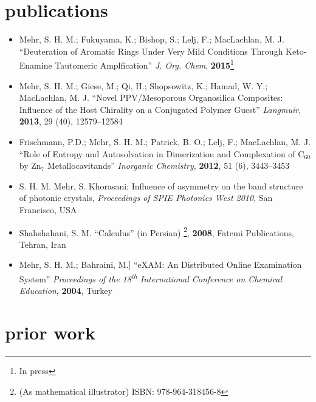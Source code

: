 \documentclass[overlapped,line,10pt,letterpaper]{res}
\begin{document}
\begin{resume}
\section{publications}
\begin{itemize}
\renewcommand{\labelitemi}{$\bullet$}
\item Mehr, S. H. M.; Fukuyama, K.; Bishop, S.; Lelj, F.; MacLachlan, M. J. ``Deuteration of Aromatic Rings Under Very Mild Conditions Through Keto-Enamine  Tautomeric Amplfication'' \emph{J. Org. Chem}, \textbf{2015}\footnote{In press}
\item  Mehr, S. H. M.; Giese, M.; Qi, H.; Shopsowitz, K.; Hamad, W. Y.; MacLachlan, M. J. ``Novel PPV/Mesoporous Organosilica Composites: Influence of the Host Chirality on a Conjugated Polymer Guest'' \emph{Langmuir}, \textbf{2013}, 29 (40), 12579–12584
\item Frischmann, P.D.; Mehr, S. H. M.; Patrick, B. O.; Lelj, F.; MacLachlan, M. J. ``Role of Entropy and Autosolvation in Dimerization and Complexation of $\mathrm{C_{60}}$ by $\mathrm{Zn_7}$ Metallocavitands'' \emph{Inorganic Chemistry}, \textbf{2012}, 51 (6), 3443–3453
\item S. H. M. Mehr, S. Khorasani; Influence of asymmetry on the band structure of photonic crystals, \emph{Proceedings of SPIE Photonics West 2010}, San Francisco, USA
\item Shahshahani, S. M. ``Calculus'' (in Persian) \footnote{ (As mathematical illustrator) ISBN: 978-964-318456-8}, \textbf{2008}, Fatemi Publications, Tehran, Iran
\item Mehr, S. H. M.; Bahraini, M.] ``eXAM: An Distributed Online Examination System'' \emph{Proceedings of the 18\textsuperscript{th} International Conference on Chemical Education}, \textbf{2004}, Turkey
\end{itemize}

\section{prior work}


\end{resume}
\end{document}
